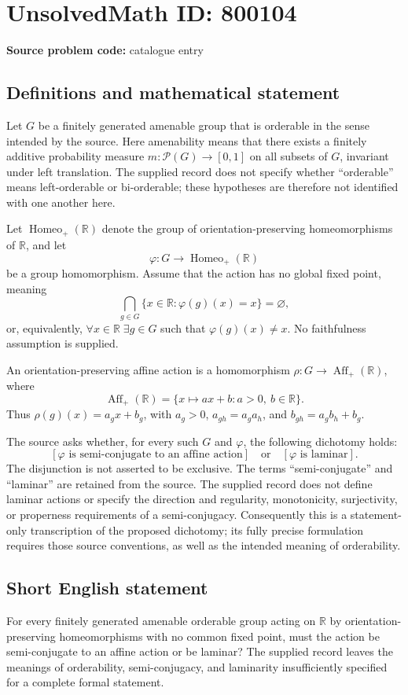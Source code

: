 \documentclass[11pt]{article}
\newcommand{\R}{\mathbb{R}}
\begin{document}
\section*{UnsolvedMath ID: 800104}
\textbf{Source problem code:} catalogue entry
\subsection{Definitions and mathematical statement}
Let \(G\) be a finitely generated amenable group that is orderable in the sense intended by the source. Here amenability means that there exists a finitely additive probability measure \(m\colon\mathcal P(G)\to[0,1]\) on all subsets of \(G\), invariant under left translation. The supplied record does not specify whether ``orderable'' means left-orderable or bi-orderable; these hypotheses are therefore not identified with one another here.

Let \(\operatorname{Homeo}_+(\R)\) denote the group of orientation-preserving homeomorphisms of \(\R\), and let
\[
\varphi\colon G\longrightarrow\operatorname{Homeo}_+(\R)
\]
be a group homomorphism. Assume that the action has no global fixed point, meaning
\[
\bigcap_{g\in G}\{x\in\R:\varphi(g)(x)=x\}=\varnothing,
\]
or, equivalently, \(\forall x\in\R\;\exists g\in G\) such that \(\varphi(g)(x)\ne x\). No faithfulness assumption is supplied.

An orientation-preserving affine action is a homomorphism \(\rho\colon G\to\operatorname{Aff}_+(\R)\), where
\[
\operatorname{Aff}_+(\R)=\{x\mapsto ax+b:a>0,\ b\in\R\}.
\]
Thus \(\rho(g)(x)=a_gx+b_g\), with \(a_g>0\), \(a_{gh}=a_ga_h\), and \(b_{gh}=a_gb_h+b_g\).

The source asks whether, for every such \(G\) and \(\varphi\), the following dichotomy holds:
\[
\left[\varphi\text{ is semi-conjugate to an affine action}\right]
\quad\text{or}\quad
\left[\varphi\text{ is laminar}\right].
\]
The disjunction is not asserted to be exclusive. The terms ``semi-conjugate'' and ``laminar'' are retained from the source. The supplied record does not define laminar actions or specify the direction and regularity, monotonicity, surjectivity, or properness requirements of a semi-conjugacy. Consequently this is a statement-only transcription of the proposed dichotomy; its fully precise formulation requires those source conventions, as well as the intended meaning of orderability.
\subsection{Short English statement}
For every finitely generated amenable orderable group acting on \(\R\) by orientation-preserving homeomorphisms with no common fixed point, must the action be semi-conjugate to an affine action or be laminar? The supplied record leaves the meanings of orderability, semi-conjugacy, and laminarity insufficiently specified for a complete formal statement.
\end{document}
